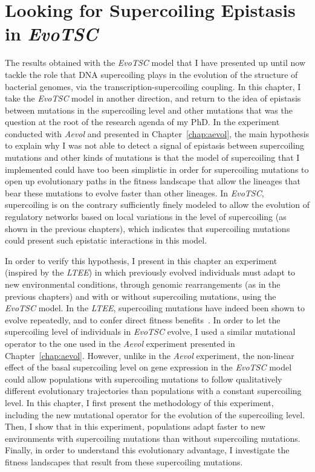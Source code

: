 \chapter{Looking for Supercoiling Epistasis in \emph{EvoTSC}}
\label{chap:epistasis}

The results obtained with the \emph{EvoTSC} model that I have presented up until now tackle the role that DNA supercoiling plays in the evolution of the structure of bacterial genomes, via the transcription-supercoiling coupling.
In this chapter, I take the \emph{EvoTSC} model in another direction, and return to the idea of epistasis between mutations in the supercoiling level and other mutations that was the question at the root of the research agenda of my PhD.
In the experiment conducted with \emph{Aevol} and presented in Chapter~\ref{chap:aevol}, the main hypothesis to explain why I was not able to detect a signal of epistasis between supercoiling mutations and other kinds of mutations is that the model of supercoiling that I implemented could have too been simplistic in order for supercoiling mutations to open up evolutionary paths in the fitness landscape that allow the lineages that bear these mutations to evolve faster than other lineages.
In \emph{EvoTSC}, supercoiling is on the contrary sufficiently finely modeled to allow the evolution of regulatory networks based on local variations in the level of supercoiling (as shown in the previous chapters), which indicates that supercoiling mutations could present such epistatic interactions in this model.

In order to verify this hypothesis, I present in this chapter an experiment (inspired by the \emph{LTEE}) in which previously evolved individuals must adapt to new environmental conditions, through genomic rearrangements (as in the previous chapters) and with or without supercoiling mutations, using the \emph{EvoTSC} model.
In the \emph{LTEE}, supercoiling mutations have indeed been shown to evolve repeatedly, and to confer direct fitness benefits~\citep{crozat2005,crozat2010}.
In order to let the supercoiling level of individuals in \emph{EvoTSC} evolve, I used a similar mutational operator to the one used in the \emph{Aevol} experiment presented in Chapter~\ref{chap:aevol}.
However, unlike in the \emph{Aevol} experiment, the non-linear effect of the basal supercoiling level on gene expression in the \emph{EvoTSC} model could allow populations with supercoiling mutations to follow qualitatively different evolutionary trajectories than populations with a constant supercoiling level.
In this chapter, I first present the methodology of this experiment, including the new mutational operator for the evolution of the supercoiling level.
Then, I show that in this experiment, populations adapt faster to new environments with supercoiling mutations than without supercoiling mutations.
Finally, in order to understand this evolutionary advantage, I investigate the fitness landscapes that result from these supercoiling mutations.


